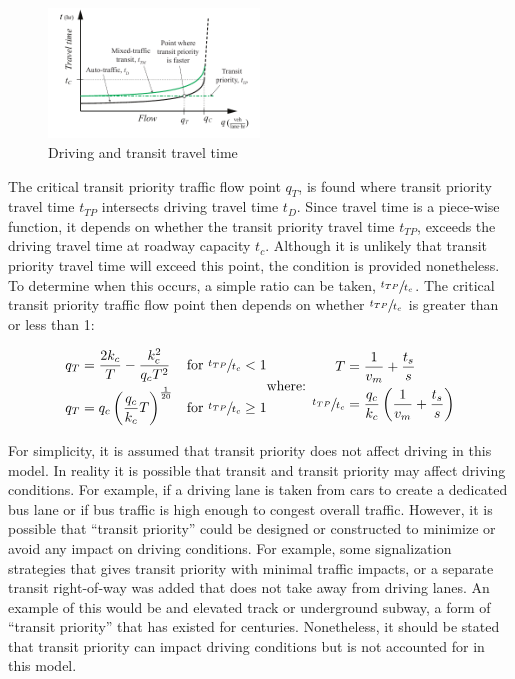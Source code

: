 \documentclass{elsarticle}\usepackage[]{graphicx}\usepackage[]{color}
\begin{document}
\begin{figure}[H]
    \centering
    \includegraphics[width=0.5\textwidth]{diagram_transit_traveltime}
    \caption{Driving and transit travel time}
    \label{fig:transittraveltime}
\end{figure}

The critical transit priority traffic flow point $q_T$, is found where transit priority travel time $t_{TP}$ intersects driving travel time $t_D$. Since travel time is a piece-wise function, it depends on whether the transit priority travel time $t_{TP}$, exceeds the driving travel time at roadway capacity $t_c$. Although it is unlikely that transit priority travel time will exceed this point, the condition is provided nonetheless. To determine when this occurs, a simple ratio can be taken, $\sfrac{t_{TP}}{t_c}$. The critical transit priority traffic flow point then depends on whether $\sfrac{t_{TP}}{t_c}$ is greater than or less than 1:

\begin{subequations}
\begin{align}
    q_T & = \frac{2k_{c}}{T} - \frac{k_{c}^{2}}{q_{c}T^{2}} & \text{for}~ \sfrac{t_{TP}}{t_c} < 1 \\
    q_T & = q_{c}\left(\frac{q_{c}}{k_{c}}T\right)^{\frac{1}{20}} & \text{for}~ \sfrac{t_{TP}}{t_c} \geq 1 \\
    \end{align}
    \text{where: }
    \begin{align}
    T & = \frac{1}{v_{m}} + \frac{t_{s}}{s}  \notag \\
    \sfrac{t_{TP}}{t_c} & = \frac{q_c}{k_c} \left( \frac{1}{v_m} + \frac{t_s}{s}  \right) \notag
    \end{align}
\end{subequations}

For simplicity, it is assumed that transit priority does not affect driving in this model. In reality it is possible that transit and transit priority may affect driving conditions. For example, if a driving lane is taken from cars to create a dedicated bus lane or if bus traffic is high enough to congest overall traffic. However, it is possible that ``transit priority'' could be designed or constructed to minimize or avoid any impact on driving conditions. For example, some signalization strategies that gives transit priority with minimal traffic impacts, or a separate transit right-of-way was added that does not take away from driving lanes. An example of this would be and elevated track or underground subway, a form of ``transit priority'' that has existed for centuries. Nonetheless, it should be stated that transit priority can impact driving conditions but is not accounted for in this model.
\end{document}
